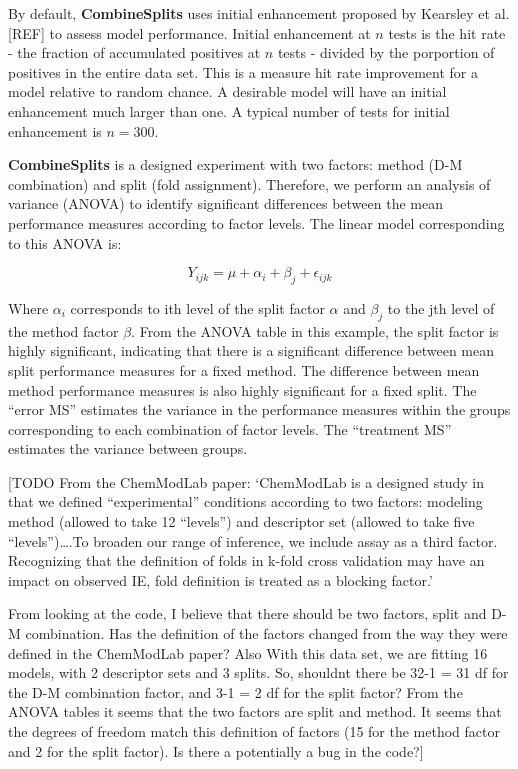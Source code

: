 By default, \textbf{CombineSplits} uses initial enhancement proposed by
Kearsley et al. {[}REF{]} to assess model performance. Initial
enhancement at \(n\) tests is the hit rate - the fraction of accumulated
positives at \(n\) tests - divided by the porportion of positives in the
entire data set. This is a measure hit rate improvement for a model
relative to random chance. A desirable model will have an initial
enhancement much larger than one. A typical number of tests for initial
enhancement is \(n=300\).

\textbf{CombineSplits} is a designed experiment with two factors: method
(D-M combination) and split (fold assignment). Therefore, we perform an
analysis of variance (ANOVA) to identify significant differences between
the mean performance measures according to factor levels. The linear
model corresponding to this ANOVA is:

\[Y_{ijk} = \mu + \alpha_i + \beta_j + \epsilon_{ijk}\]

Where \(\alpha_i\) corresponds to ith level of the split factor
\(\alpha\) and \(\beta_j\) to the jth level of the method factor
\(\beta\). From the ANOVA table in this example, the split factor is
highly significant, indicating that there is a significant difference
between mean split performance measures for a fixed method. The
difference between mean method performance measures is also highly
significant for a fixed split. The ``error MS'' estimates the variance
in the performance measures within the groups corresponding to each
combination of factor levels. The ``treatment MS'' estimates the
variance between groups.

{[}TODO From the ChemModLab paper: `ChemModLab is a designed study in
that we defined ``experimental'' conditions according to two factors:
modeling method (allowed to take 12 ``levels'') and descriptor set
(allowed to take five ``levels'')\ldots{}.To broaden our range of
inference, we include assay as a third factor. Recognizing that the
definition of folds in k-fold cross validation may have an impact on
observed IE, fold definition is treated as a blocking factor.'

From looking at the code, I believe that there should be two factors,
split and D-M combination. Has the definition of the factors changed
from the way they were defined in the ChemModLab paper? Also With this
data set, we are fitting 16 models, with 2 descriptor sets and 3 splits.
So, shouldnt there be 32-1 = 31 df for the D-M combination factor, and
3-1 = 2 df for the split factor? From the ANOVA tables it seems that the
two factors are split and method. It seems that the degrees of freedom
match this definition of factors (15 for the method factor and 2 for the
split factor). Is there a potentially a bug in the code?{]}

